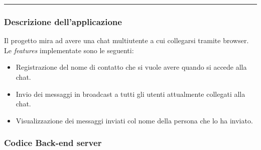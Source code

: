 \documentclass[a4paper]{article}
\newcommand{\longline}{\noindent\rule{\textwidth}{0.4pt}}
\begin{document}
	\longline
	
	\subsubsection{Descrizione dell'applicazione}
	
	Il progetto mira ad avere una chat multiutente a cui collegarsi tramite browser. Le \emph{features} implementate sono le seguenti:
	\begin{itemize}
		\item Registrazione del nome di contatto che si vuole avere quando si accede alla chat.
		
		\item Invio dei messaggi in broadcast a tutti gli utenti attualmente collegati alla chat.
	
		\item Visualizzazione dei messaggi inviati col nome della persona che lo ha inviato.
	\end{itemize}\newpage

	\subsubsection{Codice Back-end server}\label{codice Back-end server}
	
	
	
\end{document}
